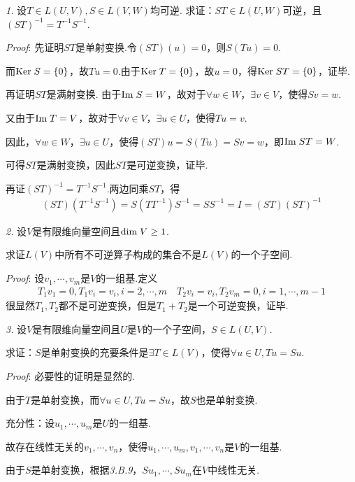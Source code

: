 \textit{1.}
设\(T \in L(U,V),S \in L(V,W)\)均可逆.
求证：\(ST \in L(U,W)\)可逆，且\((ST)^{-1}=T^{-1}S^{-1}\).

\textit{Proof}:
先证明\(ST\)是单射变换.令\((ST)(u)=0\)，则\(S(Tu)=0\).

而\(\mathrm{Ker \;} S=\{0\}\)，故\(Tu=0\).由于\(\mathrm{Ker \;} T=\{0\}\)，故\(u=0\)，得\(\mathrm{Ker \;} ST=\{0\}\)，证毕.

再证明\(ST\)是满射变换.
由于\(\mathrm{Im \;} S=W\)，故对于\(\forall w \in W\)，\(\exists v \in V\)，使得\(Sv=w\).

又由于\(\mathrm{Im \;} T=V\)，故对于\(\forall v \in V\)，\(\exists u \in U\)，使得\(Tu=v\).

因此，\(\forall w \in W\)，\(\exists u \in U\)，使得\((ST)u=S(Tu)=Sv=w\)，即\(\mathrm{Im \;} ST=W\).

可得\(ST\)是满射变换，因此\(ST\)是可逆变换，证毕.

再证\((ST)^{-1}=T^{-1}S^{-1}\).两边同乘\(ST\)，得
    \begin{align*}
        (ST)(T^{-1}S^{-1})=S(TT^{-1})S^{-1}=SS^{-1}=I=(ST)(ST)^{-1}
    \end{align*}

\hspace*{\fill}

\textit{2.}
设\(V\)是有限维向量空间且\(\mathrm{dim \;} V \geq 1\).

求证\(L(V)\)中所有不可逆算子构成的集合不是\(L(V)\)的一个子空间.

\textit{Proof}:
设\(v_1,\cdots,v_m\)是\(V\)的一组基.定义
    \begin{align*}
        T_1v_1=0,T_1v_i=v_i,i=2,\cdots,m \quad
        T_2v_i=v_i,T_2v_m=0,i=1,\cdots,m-1
    \end{align*}
很显然\(T_1,T_2\)都不是可逆变换，但是\(T_1+T_2\)是一个可逆变换，证毕.

\hspace*{\fill}

\textit{3.}
设\(V\)是有限维向量空间且\(U\)是\(V\)的一个子空间，\(S \in L(U,V)\).

求证：\(S\)是单射变换的充要条件是\(\exists T \in L(V)\)，使得\(\forall u \in U,Tu=Su\).

\textit{Proof}:
必要性的证明是显然的.

由于\(T\)是单射变换，而\(\forall u \in U,Tu=Su\)，故\(S\)也是单射变换.

充分性：设\(u_1,\cdots,u_m\)是\(U\)的一组基.

故存在线性无关的\(v_1,\cdots,v_n\)，使得\(u_1,\cdots,u_m,v_1,\cdots,v_n\)是\(V\)的一组基.

由于\(S\)是单射变换，根据\textit{3.B.9}，\(Su_1,\cdots,Su_m\)在\(V\)中线性无关.

